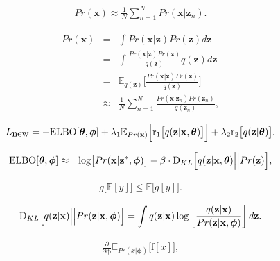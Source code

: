 \documentclass[letterpaper,twoside,openany, titlepage,oldfontcommands,titles,dvipsnames]{memoir}
\begin{document}
\begin{eqnarray}
     Pr(\mathbf{x}) \approx \frac{1}{N} \sum_{n=1}^{N}Pr(\mathbf{x}|\mathbf{z}_{n}).
 \end{eqnarray}

\begin{eqnarray}
     Pr(\mathbf{x}) &=& \int Pr(\mathbf{x}|\mathbf{z}) Pr(\mathbf{z}) d\mathbf{z}\nonumber \\
     &=& \int \frac{Pr(\mathbf{x}|\mathbf{z})Pr(\mathbf{z})}{q(\mathbf{z})} q(\mathbf{z})d\mathbf{z}\nonumber \\
     &=& \mathbb{E}_{q(\mathbf{z})}\biggl[\frac{Pr(\mathbf{x}|\mathbf{z})Pr(\mathbf{z})}{q(\mathbf{z})}\biggr]\nonumber \\
     &\approx& \frac{1}{N}\sum_{n=1}^{N}\frac{Pr(\mathbf{x}|\mathbf{z}_n)Pr(\mathbf{z}_n)}{q(\mathbf{z}_n)},
 \end{eqnarray}

\begin{eqnarray}
  L_{\mbox{new}} = -\mbox{ELBO}[\boldsymbol\theta, \boldsymbol\phi] + \lambda_{1} \mathbb{E}_{Pr(\mathbf{x})}\Bigl[\mbox{r}_{1}\bigl[q(\mathbf{z}|\mathbf{x},\boldsymbol\theta) \bigr]\Bigr] + \lambda_{2} \mbox{r}_{2}\bigl[q(\mathbf{z}|\boldsymbol\theta)\bigr].
 \end{eqnarray}

\begin{eqnarray}\label{eq:vae_beta}
 \mbox{ELBO}[\boldsymbol\theta, \boldsymbol\phi] &\approx& \log\bigl[ Pr(\mathbf{x}|\mathbf{z}^{*},\boldsymbol\phi) \bigr]- \beta\cdot \mbox{D}_{KL}\Bigl[ q(\mathbf{z}|\mathbf{x},\boldsymbol\theta)\Bigl|\Bigr|Pr(\mathbf{z})\Bigr], 
 \end{eqnarray}

\begin{eqnarray}
  g\bigl[\mathbb{E}[y]\bigr] \leq \mathbb{E}\bigl[g[y]\bigr].
 \end{eqnarray}

\begin{eqnarray}
 \mbox{D}_{KL}\Bigl[q(\mathbf{z}|\mathbf{x})\Bigl|\Bigr|Pr(\mathbf{z}|\mathbf{x},\boldsymbol\phi)\Bigr] = \int q(\mathbf{z}|\mathbf{x}) \log\left[\frac{q(\mathbf{z}|\mathbf{x})}{Pr(\mathbf{z}|\mathbf{x},\boldsymbol\phi)}\right]d\mathbf{z}.
 \end{eqnarray}

\begin{eqnarray}
 \frac{\partial}{\partial \boldsymbol\phi} \mathbb{E}_{Pr(x|\boldsymbol\phi)}\bigl[\mbox{f}[x]\bigr],
 \end{eqnarray}
\end{document}

